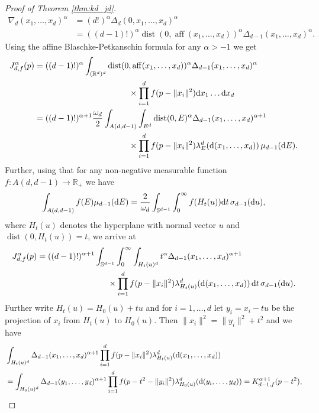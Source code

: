 \documentclass[11pt,a4paper]{article}
\theoremstyle{plain}
\theoremstyle{definition}
\theoremstyle{remark}
\newcommand{\dist}{\mathop{\mathrm{dist}}\nolimits}
\def\RR{\mathbb{R}}
\def\SS{\mathbb{S}}
\newcommand{\dd}{{\rm d}}
\newcommand{\aff}{\mathop{\mathrm{aff}}\nolimits}
\newcommand{\dint}{\textup{d}}
\begin{document}
\begin{proof}[Proof of Theorem \ref{thm:kd_jd}]
\begin{align*}
        \nabla_d(x_1,\dots,x_d)^\alpha&=(d!)^\alpha \Delta_{d}(0,x_1,\dots,x_d)^\alpha\\
        &=((d-1)!)^\alpha \dist(0,\aff(x_1,\dots,x_d))^\alpha \Delta_{d-1}(x_1,\dots,x_d)^\alpha.
    \end{align*}
    Using the affine Blaschke-Petkanschin formula \cite[Theorem 7.2.7]{SW} for any $\alpha>-1$ we get
    \begin{align*}
        J_{d,f}^\alpha(p) 
        &=((d-1)!)^\alpha\int_{(\RR^d)^d} \dist(0,\aff(x_1,\dots,x_d))^\alpha \Delta_{d-1} (x_1,\dots,x_d)^\alpha\\
        &\hspace{4cm}\times\prod_{i=1}^{d} f(p-\|x_i\|^2)\dd x_1\dots \dd x_d\\
        &=((d-1)!)^{\alpha+1}{\omega_d\over 2}\int_{A(d,d-1)}\int_{E^d} \dist(0,E)^\alpha\Delta_{d-1}(x_1,\dots,x_d)^{\alpha+1} \\
        &\hspace{4cm}\times \prod_{i=1}^{d} f(p-\|x_i\|^2)  \lambda_E^d(\dd(x_1,\dots,x_d))\,\mu_{d-1}(\dd E).
    \end{align*}
    Further, using that for any non-negative measurable function $f\colon A(d,d-1)\to \RR_+$ we have 
    $$
        \int_{A(d,d-1)}f(E)\mu_{d-1}(\dint E)={2\over \omega_{d}}\int_{\SS^{d-1}}\int_{0}^{\infty}f(H_t(u))\dint t\,\sigma_{d-1}(\dint u),
    $$
    where $H_t(u)$ denotes the hyperplane with normal vector $u$ and $\dist(0, H_t(u))=t$, we arrive at
    \begin{align*}
       J_{d,f}^\alpha(p)
        &=((d-1)!)^{\alpha+1}\int_{\SS^{d-1}}\int_{0}^{\infty}\int_{H_t(u)^d} t^\alpha \Delta_{d-1}(x_1,\dots,x_d)^{\alpha+1}\\
        &\hspace{3cm}\times\prod_{i=1}^{d} f(p-\|x_i\|^2) \lambda_{H_t(u)}^d(\dd(x_1,\dots,x_d))\,\dd t \,\sigma_{d-1}(\dd u).
    \end{align*}
    Further write $H_t(u) = H_0(u) + t u$ and for $i=1,\dots,d$ let $y_i=x_i-tu$ be the projection of $x_i$ from $H_t(u)$ to $H_0(u)$. Then $\|x_i\|^2 = \|y_i\|^2 + t^2$ and we have 
    \begin{align*}
        &\int_{H_t(u)^d} \Delta_{d-1}(x_1,\dots,x_d)^{\alpha+1} \prod_{i=1}^{d} f(p-\|x_i\|^2) \lambda_{H_t(u)}^d(\dd (x_1,\dots,x_d))\\
        &=\int_{H_0(u)^d} \Delta_{d-1}(y_1,\dots,y_d)^{\alpha+1} \prod_{i=1}^{d} f(p-t^2-\|y_i\|^2)\lambda_{H_0(u)}^d(\dd(y_i,\dots,y_d))=K_{d-1,f}^{\alpha+1}(p-t^2),
    \end{align*}

\end{proof}
\end{document}
